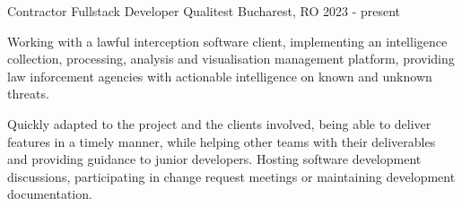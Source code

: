 \cventry
    {Contractor Fullstack Developer}
    {Qualitest} %
    {Bucharest, RO} %
    {2023 - present} %
    {\begin{cvitems}
         \item{Working with a lawful interception software client, implementing an intelligence collection, processing,
         analysis and visualisation management platform, providing law inforcement agencies with actionable intelligence
         on known and unknown threats.}
         \item{Quickly adapted to the project and the clients involved, being able to deliver features in a timely manner, while
         helping other teams with their deliverables and providing guidance to junior developers. Hosting software
         development discussions, participating in change request meetings or maintaining development documentation. }
    \end{cvitems}}
